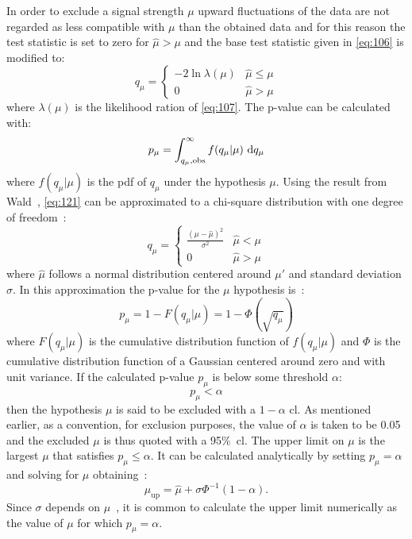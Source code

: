 In order to exclude a signal strength $\mu$ upward fluctuations of the data are
not regarded as less compatible with $\mu$ than the obtained data and for this
reason the test statistic is set to zero for $\hat{\mu} > \mu$ and the base test
statistic given in \cref{eq:106} is modified to:
\begin{equation}
  \label{eq:121}
  q_\mu =
  \left\{
    \begin{array}{lr}
      - 2 \ln \lambda(\mu)  & \hat{\mu} \leq \mu \\
      0 & \hat{\mu} > \mu
    \end{array}
    \right.
\end{equation}
where $\lambda(\mu)$ is the likelihood ration of \cref{eq:107}. The p-value can
be calculated with:
\begin{equation}
  \label{eq:50}
  p_\mu = \int_{q_\mu, \mathrm{obs}}^\infty f(q_\mu | \mu)~\mathrm{d} q_\mu
\end{equation}
where $f(q_\mu | \mu)$ is the \gls{pdf} of $q_\mu$ under the hypothesis
$\mu$. Using the result from Wald~\cite{WaldApproximation}, \eqref{eq:121} can
be approximated to a chi-square distribution with one degree of
freedom~\cite{StatProcedure}:
\begin{equation}
  \label{eq:122}
  q_\mu =
  \left\{
    \begin{array}{lr}
      \frac{(\mu - \hat{\mu})^2}{\sigma^2}  & \hat{\mu} < \mu \\
      0 & \hat{\mu} > \mu
    \end{array}
    \right.
\end{equation}
where $\hat{\mu}$ follows a normal distribution centered around $\mu'$ and
standard deviation $\sigma$. In this approximation the p-value for the $\mu$
hypothesis is~\cite{StatProcedure}:
\begin{equation}
  \label{eq:123}
  p_\mu = 1 - F(q_\mu|\mu) = 1 - \Phi(\sqrt{q_\mu})
\end{equation}
where $F(q_\mu|\mu)$ is the cumulative distribution function of $f(q_\mu|\mu)$
and $\Phi$ is the cumulative distribution function of a Gaussian centered around
zero and with unit variance. If the calculated p-value $p_\mu$ is below some
threshold $\alpha$:
\begin{equation}
  \label{eq:124}
  p_\mu < \alpha
\end{equation}
then the hypothesis $\mu$ is said to be excluded with a $1 - \alpha$
\gls{cl}. As mentioned earlier, as a convention, for exclusion purposes, the
value of $\alpha$ is taken to be 0.05 and the excluded $\mu$ is thus quoted with
a 95\%~\gls{cl}. The upper limit on $\mu$ is the largest $\mu$ that satisfies
$p_\mu \leq \alpha$. It can be calculated analytically by setting $p_\mu =
\alpha$ and solving for $\mu$ obtaining~\cite{StatProcedure}:
\begin{equation}
  \label{eq:125}
  \mu_{\mathrm{up}} = \hat{\mu} + \sigma \Phi^{-1}(1 - \alpha).
\end{equation}
Since $\sigma$ depends on $\mu$~\cite{StatProcedure}, it is common to calculate
the upper limit numerically as the value of $\mu$ for which $p_\mu = \alpha$.
